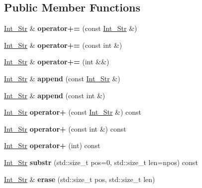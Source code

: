 \subsection*{Public Member Functions}
\begin{DoxyCompactItemize}
\item 
\mbox{\label{classInt__Str_a60811d3005bed5b04f07d9e76725585f}} 
\hyperlink{classInt__Str}{Int\+\_\+\+Str} \& {\bfseries operator+=} (const \hyperlink{classInt__Str}{Int\+\_\+\+Str} \&)
\item 
\mbox{\label{classInt__Str_a59a0385a61b301237ce2867534a874d3}} 
\hyperlink{classInt__Str}{Int\+\_\+\+Str} \& {\bfseries operator+=} (const int \&)
\item 
\mbox{\label{classInt__Str_a479979830665bac8db3faaa6bbc5d757}} 
\hyperlink{classInt__Str}{Int\+\_\+\+Str} \& {\bfseries operator+=} (int \&\&)
\item 
\mbox{\label{classInt__Str_ae8ab9c74d87a9d57aa05d307595f28ed}} 
\hyperlink{classInt__Str}{Int\+\_\+\+Str} \& {\bfseries append} (const \hyperlink{classInt__Str}{Int\+\_\+\+Str} \&)
\item 
\mbox{\label{classInt__Str_a40f839f59804aebc4465a07790a14145}} 
\hyperlink{classInt__Str}{Int\+\_\+\+Str} \& {\bfseries append} (const int \&)
\item 
\mbox{\label{classInt__Str_a9c5eac2de96578033443396b1e5096b8}} 
\hyperlink{classInt__Str}{Int\+\_\+\+Str} {\bfseries operator+} (const \hyperlink{classInt__Str}{Int\+\_\+\+Str} \&) const
\item 
\mbox{\label{classInt__Str_ac3464ca7854d86178a90cfa72aeaa064}} 
\hyperlink{classInt__Str}{Int\+\_\+\+Str} {\bfseries operator+} (const int \&) const
\item 
\mbox{\label{classInt__Str_aeba1b1ef0ff0302da41547bfeaada690}} 
\hyperlink{classInt__Str}{Int\+\_\+\+Str} {\bfseries operator+} (int) const
\item 
\mbox{\label{classInt__Str_afdda294e03fc043c89efd9bbaa130fee}} 
\hyperlink{classInt__Str}{Int\+\_\+\+Str} {\bfseries substr} (std\+::size\+\_\+t pos=0, std\+::size\+\_\+t len=npos) const
\item 
\mbox{\label{classInt__Str_a229a4463cc501ed64f0796513341fa64}} 
\hyperlink{classInt__Str}{Int\+\_\+\+Str} \& {\bfseries erase} (std\+::size\+\_\+t pos, std\+::size\+\_\+t len)
\end{DoxyCompactItemize}
